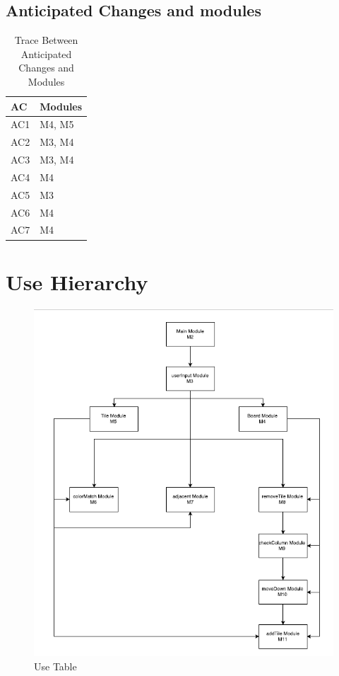 \documentclass[12pt]{article}
\begin{document}
\subsection{Anticipated Changes and modules}
\begin{table}[H]
\centering
\begin{tabular}{p{} p{}}
\toprule
\textbf{AC} & \textbf{Modules}\\
\midrule
AC1 & M4, M5\\
AC2 & M3, M4\\
AC3 & M3, M4\\
AC4 & M4\\
AC5 & M3\\
AC6 & M4\\
AC7 & M4\\
\bottomrule
\end{tabular}
\caption{Trace Between Anticipated Changes and Modules}
\label{TblRT}
\end{table}

\section{Use Hierarchy}
\begin{figure}[h!]
\includegraphics[width=17cm]{useTable}
\caption{Use Table}
\end{figure}
\newpage
\end{document}

